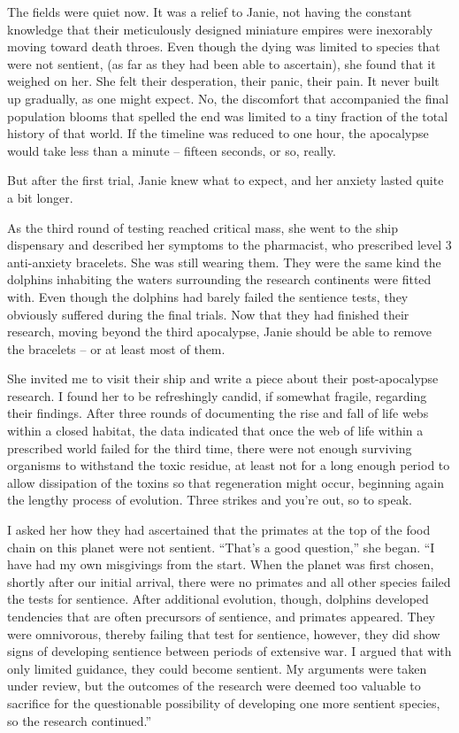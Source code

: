 The fields were quiet now. It was a relief to Janie, not having the
constant knowledge that their meticulously designed miniature empires
were inexorably moving toward death throes. Even though the dying was
limited to species that were not sentient, (as far as they had been able
to ascertain), she found that it weighed on her. She felt their
desperation, their panic, their pain. It never built up gradually, as
one might expect. No, the discomfort that accompanied the final
population blooms that spelled the end was limited to a tiny fraction of
the total history of that world. If the timeline was reduced to one
hour, the apocalypse would take less than a minute -- fifteen seconds,
or so, really.

But after the first trial, Janie knew what to expect, and her anxiety
lasted quite a bit longer.

As the third round of testing reached critical mass, she went to the
ship dispensary and described her symptoms to the pharmacist, who
prescribed level 3 anti-anxiety bracelets. She was still wearing them.
They were the same kind the dolphins inhabiting the waters surrounding
the research continents were fitted with. Even though the dolphins had
barely failed the sentience tests, they obviously suffered during the
final trials. Now that they had finished their research, moving beyond
the third apocalypse, Janie should be able to remove the bracelets -- or
at least most of them.

She invited me to visit their ship and write a piece about their
post-apocalypse research. I found her to be refreshingly candid, if
somewhat fragile, regarding their findings. After three rounds of
documenting the rise and fall of life webs within a closed habitat, the
data indicated that once the web of life within a prescribed world
failed for the third time, there were not enough surviving organisms to
withstand the toxic residue, at least not for a long enough period to
allow dissipation of the toxins so that regeneration might occur,
beginning again the lengthy process of evolution. Three strikes and
you're out, so to speak.

I asked her how they had ascertained that the primates at the top of the
food chain on this planet were not sentient. ``That's a good question,''
she began. ``I have had my own misgivings from the start. When the
planet was first chosen, shortly after our initial arrival, there were
no primates and all other species failed the tests for sentience. After
additional evolution, though, dolphins developed tendencies that are
often precursors of sentience, and primates appeared. They were
omnivorous, thereby failing that test for sentience, however, they did
show signs of developing sentience between periods of extensive war. I
argued that with only limited guidance, they could become sentient. My
arguments were taken under review, but the outcomes of the research were
deemed too valuable to sacrifice for the questionable possibility of
developing one more sentient species, so the research continued.''

